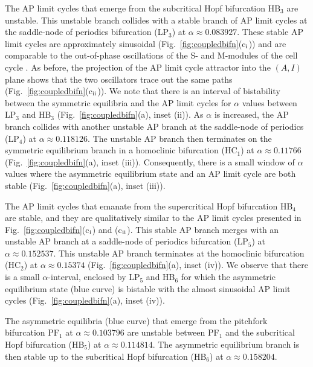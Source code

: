 \documentclass[10pt,onecolumn]{article}
\theoremstyle{plain}
\begin{document}
The AP limit cycles that emerge from the subcritical Hopf bifurcation HB$_3$ are unstable. This unstable branch collides with a stable branch of AP limit cycles at the saddle-node of periodics bifurcation (LP$_3$) at $\alpha \approx 0.083927$. These stable AP limit cycles are approximately sinusoidal (Fig.~\ref{fig:coupledbifn}(c$_{\rm i}$)) and are comparable to the out-of-phase oscillations of the S- and M-modules of the cell cycle \cite{Dragoi2024}. As before, the projection of the AP limit cycle attractor into the $(A,I)$ plane shows that the two oscillators trace out the same paths (Fig.~\ref{fig:coupledbifn}(c$_{\rm ii}$)). We note that there is an interval of bistability between the symmetric equilibria and the AP limit cycles for $\alpha$ values between LP$_3$ and HB$_3$ (Fig.~\ref{fig:coupledbifn}(a), inset (ii)).
As $\alpha$ is increased, the AP branch collides with another unstable AP branch at the saddle-node of periodics (LP$_4$) at $\alpha \approx 0.118126$. 
The unstable AP branch then terminates on the symmetric equilibrium branch in a homoclinic bifurcation (HC$_1$) at $\alpha \approx 0.11766$ (Fig.~\ref{fig:coupledbifn}(a), inset (iii)).
Consequently, there is a small window of $\alpha$ values where the asymmetric equilibrium state and an AP limit cycle are both stable (Fig.~\ref{fig:coupledbifn}(a), inset (iii)).  

The AP limit cycles that emanate from the supercritical Hopf bifurcation HB$_4$ are stable, and they are qualitatively similar to the AP limit cycles presented in Fig.~\ref{fig:coupledbifn}(c$_{\rm i}$) and (c$_{\rm ii}$). This stable AP branch merges with an unstable AP branch at a saddle-node of periodics bifurcation (LP$_5$) at $\alpha \approx 0.152537$. This unstable AP branch terminates at the homoclinic bifurcation (HC$_2$) at $\alpha \approx 0.15374$ (Fig.~\ref{fig:coupledbifn}(a), inset (iv)). We observe that there is a small $\alpha$-interval, enclosed by LP$_5$ and HB$_6$ for which the asymmetric equilibrium state (blue curve) is bistable with the almost sinusoidal AP limit cycles (Fig.~\ref{fig:coupledbifn}(a), inset (iv)).

The asymmetric equilibria (blue curve) that emerge from the pitchfork bifurcation PF$_1$ at $\alpha \approx 0.103796$ are unstable between PF$_1$ and the subcritical Hopf bifurcation (HB$_5$) at $\alpha \approx 0.114814$. The asymmetric equilibrium branch is then stable up to the subcritical Hopf bifurcation (HB$_6$) at $\alpha \approx 0.158204$.
\end{document}
